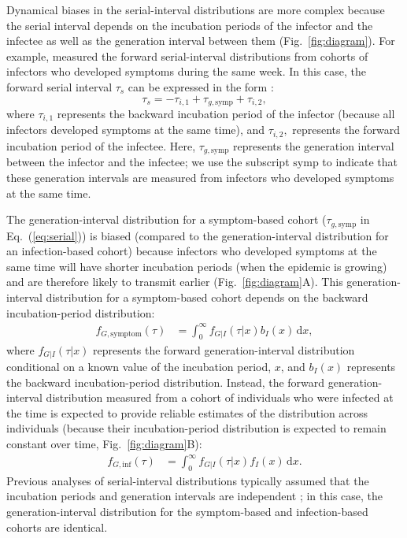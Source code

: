 \documentclass[12pt]{article}
\newcommand{\eref}[1]{Eq.~(\ref{eq:#1})}
\newcommand{\fref}[1]{Fig.~\ref{fig:#1}}
\newcommand{\dd}[1]{\ensuremath{\, \mathrm{d}#1}}
\newcommand{\dx}{\dd{x}}
\begin{document}
Dynamical biases in the serial-interval distributions are more complex because the serial interval depends on the incubation periods of the infector and the infectee as well as the generation interval between them (\fref{diagram}).
For example, \cite{backer2021omicron} measured the forward serial-interval distributions from cohorts of infectors who developed symptoms during the same week.
In this case, the forward serial interval $\tau_s$ can be expressed in the form \citep{park2021forward}:
\begin{equation}
\tau_s =  - \tau_{i, 1} + \tau_{g, \mathrm{symp}} + \tau_{i, 2},
\label{eq:serial}
\end{equation}
where $\tau_{i, 1}$ represents the backward incubation period of the infector (because all infectors developed symptoms at the same time), and $\tau_{i, 2},$ represents the forward incubation period of the infectee.
Here, $\tau_{g, \mathrm{symp}}$ represents the generation interval between the infector and the infectee; we use the subscript $\mathrm{symp}$ to indicate that these generation intervals are measured from infectors who developed symptoms at the same time.

The generation-interval distribution for a symptom-based cohort ($\tau_{g, \mathrm{symp}}$ in \eref{serial}) is biased (compared to the generation-interval distribution for an infection-based cohort) because infectors who developed symptoms at the same time will have shorter incubation periods (when the epidemic is growing) and are therefore likely to transmit earlier (\fref{diagram}A).
This generation-interval distribution for a symptom-based cohort depends on the backward incubation-period distribution:
\begin{align}
f_{G, \mathrm{symptom}}(\tau) &= \int_0^\infty f_{G|I}(\tau|x) b_I(x) \dx,
\end{align}
where $f_{G|I}(\tau|x)$ represents the forward generation-interval distribution conditional on a known value of the incubation period, $x$, and $b_I(x)$ represents the backward incubation-period distribution.
Instead, the forward generation-interval distribution measured from a cohort of individuals who were infected at the time is expected to provide reliable estimates of the distribution across individuals (because their incubation-period distribution is expected to remain constant over time, \fref{diagram}B):
\begin{align}
f_{G, \mathrm{inf}}(\tau) &= \int_0^\infty f_{G|I}(\tau|x) f_I(x) \dx.
\label{eq:meangen}
\end{align}
Previous analyses of serial-interval distributions typically assumed that the incubation periods and generation intervals are independent \citep{ganyani2020estimating}; in this case, the generation-interval distribution for the symptom-based and infection-based cohorts are identical.
\end{document}
